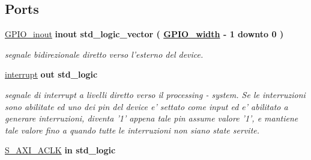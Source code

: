 \subsection*{Ports}
 \begin{DoxyCompactItemize}
\item 
\hypertarget{classmy_g_p_i_o___a_x_i_ga8829699d739ef35a4c5da396ffd38387}{\hyperlink{group___a_x_i-internal_ga8829699d739ef35a4c5da396ffd38387}{G\+P\+I\+O\+\_\+inout}  {\bfseries {\bfseries \textcolor{vhdlchar}{inout}\textcolor{vhdlchar}{ }}} {\bfseries \textcolor{vhdlchar}{std\+\_\+logic\+\_\+vector}\textcolor{vhdlchar}{ }\textcolor{vhdlchar}{(}\textcolor{vhdlchar}{ }\textcolor{vhdlchar}{ }\textcolor{vhdlchar}{ }\textcolor{vhdlchar}{ }{\bfseries \hyperlink{group___a_x_i-internal_ga0b52ca75e9a6093b2b60d5e851803069}{G\+P\+I\+O\+\_\+width}} \textcolor{vhdlchar}{-\/}\textcolor{vhdlchar}{ } \textcolor{vhdldigit}{1} \textcolor{vhdlchar}{ }\textcolor{vhdlchar}{downto}\textcolor{vhdlchar}{ }\textcolor{vhdlchar}{ } \textcolor{vhdldigit}{0} \textcolor{vhdlchar}{ }\textcolor{vhdlchar}{)}\textcolor{vhdlchar}{ }} }\label{classmy_g_p_i_o___a_x_i_ga8829699d739ef35a4c5da396ffd38387}

\begin{DoxyCompactList}\small\item\em segnale bidirezionale diretto verso l'esterno del device. \end{DoxyCompactList}\item 
\hypertarget{classmy_g_p_i_o___a_x_i_ga5b78f3e3edfaf6e8ec79031b9e631e9d}{\hyperlink{group___a_x_i-internal_ga5b78f3e3edfaf6e8ec79031b9e631e9d}{interrupt}  {\bfseries {\bfseries \textcolor{vhdlchar}{out}\textcolor{vhdlchar}{ }}} {\bfseries \textcolor{vhdlchar}{std\+\_\+logic}\textcolor{vhdlchar}{ }} }\label{classmy_g_p_i_o___a_x_i_ga5b78f3e3edfaf6e8ec79031b9e631e9d}

\begin{DoxyCompactList}\small\item\em segnale di interrupt a livelli diretto verso il processing -\/ system. Se le interruzioni sono abilitate ed uno dei pin del device e' settato come input ed e' abilitato a generare interruzioni, diventa '1' appena tale pin assume valore '1', e mantiene tale valore fino a quando tutte le interruzioni non siano state servite. \end{DoxyCompactList}\item 
\hypertarget{classmy_g_p_i_o___a_x_i_ga3f54d782a88290bdaa6baffd7cd84ab4}{\hyperlink{group___a_x_i-internal_ga3f54d782a88290bdaa6baffd7cd84ab4}{S\+\_\+\+A\+X\+I\+\_\+\+A\+C\+L\+K}  {\bfseries {\bfseries \textcolor{vhdlchar}{in}\textcolor{vhdlchar}{ }}} {\bfseries \textcolor{vhdlchar}{std\+\_\+logic}\textcolor{vhdlchar}{ }} }\label{classmy_g_p_i_o___a_x_i_ga3f54d782a88290bdaa6baffd7cd84ab4}


\end{DoxyCompactItemize}
